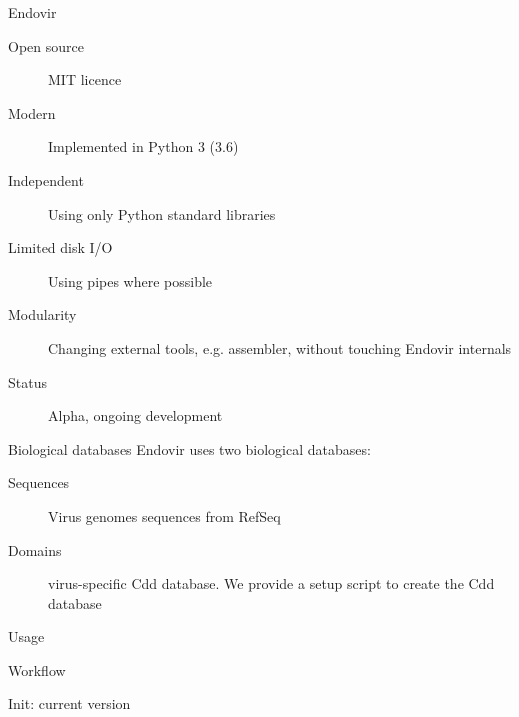 \documentclass{beamer}
\begin{document}
  \begin{frame}{Endovir}
    \begin{description}
      \item[Open source] MIT licence
      \item[Modern] Implemented in Python 3 (3.6)
      \item[Independent] Using only Python standard libraries
      \item[Limited disk I/O] Using pipes where possible
      \item[Modularity] Changing external tools, e.g. assembler,
                         without touching Endovir internals
      \item[Status] Alpha, ongoing development
    \end{description}
  \end{frame}

  \begin{frame}{Biological databases}
    Endovir uses two biological databases:
    \begin{description}
        \item[Sequences] Virus genomes sequences from RefSeq
        \item[Domains] virus-specific Cdd database. We provide a setup script
                       to create the Cdd database
    \end{description}
  \end{frame}

  \begin{frame}{Usage}
    
  \end{frame}

  \begin{frame}{Workflow}
    \resizebox{\linewidth}{!}{}
  \end{frame}


  \begin{frame}{Init: current version}
    \resizebox{\linewidth}{!}{}
  \end{frame}
\end{document}
